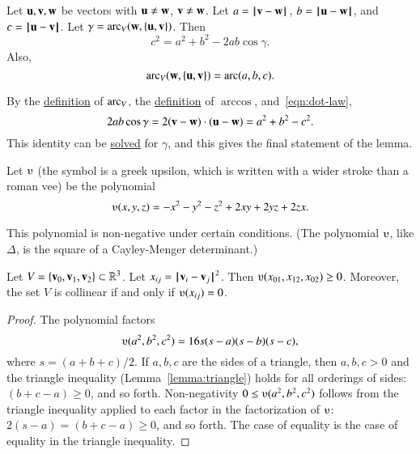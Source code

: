 \begin{lemma}\label{lemma:loc}
Let ${\mathbf u},{\mathbf v},{\mathbf w}$ be vectors with ${\mathbf u}\ne {\mathbf w}$, ${\mathbf v}\ne {\mathbf w}$.  Let $a
    = {\hskip0.1em|\hskip-0.15em|\hskip0.1em}{\mathbf v}  -  {\mathbf w}{\hskip0.1em|\hskip-0.15em|\hskip0.1em}$, $b = {\hskip0.1em|\hskip-0.15em|\hskip0.1em}{\mathbf u}  -  {\mathbf w}{\hskip0.1em|\hskip-0.15em|\hskip0.1em}$, and $c = {\hskip0.1em|\hskip-0.15em|\hskip0.1em}{\mathbf u}  -  {\mathbf v}{\hskip0.1em|\hskip-0.15em|\hskip0.1em}$.
    Let $\gamma=\operatorname{arc}_V({\mathbf w},\{{\mathbf u},{\mathbf v}\})$.    Then
        $$c^2 = a^2 + b^2 - 2 a b \cos\gamma.$$
Also,
$$
\operatorname{arc}_V({\mathbf w},\{{\mathbf u},{\mathbf v}\})= \operatorname{arc}(a,b,c).
$$

\end{lemma}
%
%
%
%
\begin{proved}
By the \hyperref[def:angle]{definition} of $\operatorname{arc}_V$, the
\hyperref[def:arccos]{definition} of $\arccos$, and~\eqref{eqn:dot-law},
$$
2 a b \cos \gamma = 2 ({\mathbf v} - {\mathbf w})\cdot ({\mathbf u} - {\mathbf w}) = a^2 + b^2 - c^2.
$$
This identity can be \hyperref[def:arccos]{solved} for $\gamma$, and this gives the final statement of the lemma.
\swallowed\end{proved}


\begin{definition}[$\ups$]\label{def:ups}
Let $\ups$ (the symbol is a greek upsilon, which is written with a
wider stroke than a roman vee) be the polynomial
    $$\ups(x,y,z) = -x^2 - y^2 - z^2 + 2 x y + 2 y z + 2 z x.$$
%
\end{definition}



This polynomial is non-negative under certain conditions. (The polynomial
$\ups$, like $\Delta$, 
is the square of a Cayley-Menger determinant.)  


\begin{lemma}  \label{lemma:ups}
Let $V=\{{\mathbf v}_0,{\mathbf v}_1,{\mathbf v}_2\}\subset\mathbb{R}^3$.  Let $x_{ij} = {\hskip0.1em|\hskip-0.15em|\hskip0.1em}{\mathbf v}_i - {\mathbf v}_j{\hskip0.1em|\hskip-0.15em|\hskip0.1em}^2$.
Then $\ups(x_{01},x_{12},x_{02})\ge 0$.  Moreover, the set $V$ is collinear
 if and only if
$\ups(x_{ij}) = 0$.
\end{lemma}

\begin{proof}
The polynomial factors
    $$\ups(a^2,b^2,c^2) = 16 s (s-a) (s-b) (s-c),$$
where $s = (a+b+c)/2$.
If $a,b,c$ are the sides of a triangle, then $a,b,c>0$ and the 
triangle inequality (Lemma~\ref{lemma:triangle}) holds for all orderings of sides: $(b+c-a)\ge 0$, and so forth.
Non-negativity $0\le
\ups(a^2,b^2,c^2)$ follows from the triangle inequality applied to
each factor in the factorization of $\ups$: $2(s-a) = (b+c-a) \ge0$, and
so forth.  The case of equality is the case of equality in the triangle inequality.
%
%
\end{proof}


